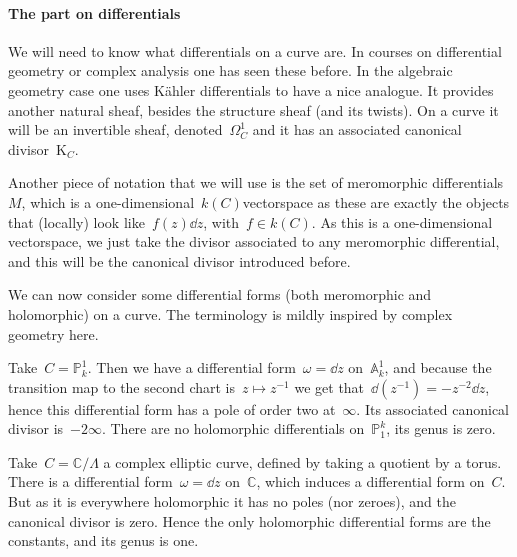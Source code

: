 \documentclass[10pt,a4paper]{article}
\begin{document}
\paragraph{The part on differentials}
We will need to know what differentials on a curve are. In courses on differential geometry or complex analysis one has seen these before. In the algebraic geometry case one uses K\"ahler differentials to have a nice analogue. It provides another natural sheaf, besides the structure sheaf (and its twists). On a curve it will be an invertible sheaf, denoted~$\Omega_C^1$ and it has an associated canonical divisor~$\mathrm{K}_C$.

Another piece of notation that we will use is the set of meromorphic differentials~$M$, which is a one-dimensional~$k(C)$\dash vectorspace as these are exactly the objects that (locally) look like~$f(z)\dd z$, with~$f\in k(C)$. As this is a one-dimensional vectorspace, we just take the divisor associated to any meromorphic differential, and this will be the canonical divisor introduced before.

We can now consider some differential forms (both meromorphic and holomorphic) on a curve. The terminology is mildly inspired by complex geometry here.
\begin{example}
  Take~$C=\mathbb{P}_k^1$. Then we have a differential form~$\omega=\dd z$ on~$\mathbb{A}_k^1$, and because the transition map to the second chart is~$z\mapsto z^{-1}$ we get that~$\dd(z^{-1})=-z^{-2}\dd z$, hence this differential form has a pole of order two at~$\infty$. Its associated canonical divisor is~$-2\infty$. There are no holomorphic differentials on~$\mathbb{P}_1^k$, its genus is zero.
\end{example}
\begin{example}
  Take~$C=\mathbb{C}/\Lambda$ a complex elliptic curve, defined by taking a quotient by a torus. There is a differential form~$\omega=\dd z$ on~$\mathbb{C}$, which induces a differential form on~$C$. But as it is everywhere holomorphic it has no poles (nor zeroes), and the canonical divisor is zero. Hence the only holomorphic differential forms are the constants, and its genus is one.
\end{example}
\end{document}
